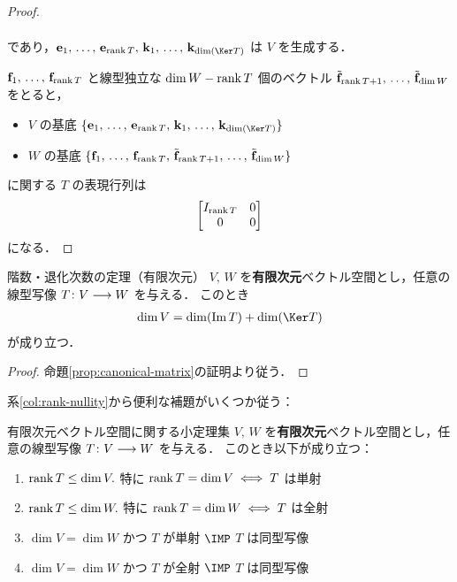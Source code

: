 \documentclass[geometry_main]{subfiles}
\begin{document}
\begin{proof}
\begin{description}
\begin{align}
		\end{align}
		であり，$\vb{e}_1,\, \dots ,\, \vb{e}_{\rank T},\, \vb{k}_1,\, \dots,\, \vb{k}_{\dim (\Ker T)}$ は $V$ を生成する．
	\end{description}
	$\vb{f}_1,\, \dots,\, \vb{f}_{\rank T}$ と線型独立な $\dim W - \rank T$ 個のベクトル $\tilde{\vb{f}}_{\rank T + 1},\, \dots,\, \tilde{\vb{f}}_{\dim W}$ をとると，
	\begin{itemize}
		\item $V$ の基底 $\{\vb{e}_1,\, \dots ,\, \vb{e}_{\rank T},\, \vb{k}_1,\, \dots,\, \vb{k}_{\dim (\Ker T)}\}$ 
		\item $W$ の基底 $\{\vb{f}_1,\, \dots,\, \vb{f}_{\rank T},\, \tilde{\vb{f}}_{\rank T + 1},\, \dots,\, \tilde{\vb{f}}_{\dim W}\}$
	\end{itemize}
	に関する $T$ の表現行列は
	\begin{align}
		\mqty[I_{\rank T} & 0 \\ 0 & 0]
	\end{align}
	になる．
\end{proof}

\begin{mycol}[label=col:rank-nullity]{階数・退化次数の定理（有限次元）}
	$V,\, W$ を\textbf{有限次元}ベクトル空間とし，任意の線型写像 $T \colon V \longrightarrow W$ を与える．
	このとき
	\begin{align}
		\dim V = \dim (\Im T) + \dim (\Ker T)
	\end{align}
	が成り立つ．
\end{mycol}

\begin{proof}
	命題\ref{prop:canonical-matrix}の証明より従う．
\end{proof}

系\ref{col:rank-nullity}から便利な補題がいくつか従う：

\begin{mylem}[label=lem:finvec-basic]{有限次元ベクトル空間に関する小定理集}
	$V,\, W$ を\textbf{有限次元}ベクトル空間とし，任意の線型写像 $T \colon V \longrightarrow W$ を与える．
	このとき以下が成り立つ：
	\begin{enumerate}
		\item $\rank T \le \dim V.$ 特に $\rank T = \dim V \iff T$ は単射
		\item $\rank T \le \dim W.$ 特に $\rank T = \dim W \iff T$ は全射
		\item $\dim V = \dim W$ かつ $T$ が単射 $\IMP$ $T$ は同型写像
		\item $\dim V = \dim W$ かつ $T$ が全射 $\IMP$ $T$ は同型写像
	\end{enumerate}
\end{mylem}
\end{document}
